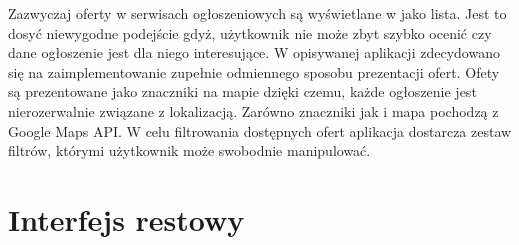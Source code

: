 Zazwyczaj oferty w serwisach ogłoszeniowych są wyświetlane w jako lista. Jest to dosyć niewygodne podejście gdyż, użytkownik nie może zbyt szybko ocenić czy dane ogłoszenie jest dla niego interesujące. W opisywanej aplikacji zdecydowano się na zaimplementowanie zupełnie odmiennego sposobu prezentacji ofert. Ofety są prezentowane jako znaczniki na mapie dzięki czemu, każde ogłoszenie jest nierozerwalnie związane z lokalizacją. Zarówno znaczniki jak i mapa pochodzą z Google Maps API. W celu filtrowania dostępnych ofert aplikacja dostarcza zestaw filtrów, którymi użytkownik może swobodnie manipulować. 

\section{Interfejs restowy}
\label{sec:interfejsRestowy}

